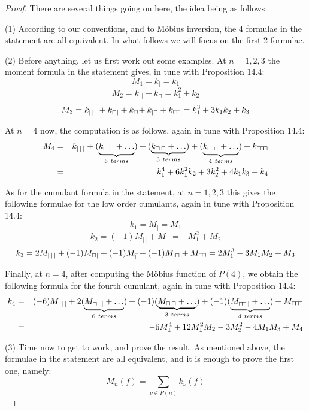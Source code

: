 \documentclass[12pt]{amsbook}
\begin{document}
\begin{proof}
There are several things going on here, the idea being as follows:

\medskip

(1) According to our conventions, and to M\"obius inversion, the 4 formulae in the statement are all equivalent. In what follows we will focus on the first 2 formulae.

\medskip

(2) Before anything, let us first work out some examples. At $n=1,2,3$ the moment formula in the statement gives, in tune with Proposition 14.4:
$$M_1=k_|=k_1$$
$$M_2=k_{|\,|}+k_\sqcap=k_1^2+k_2$$
$$M_3=k_{|\,|\,|}+k_{\sqcap|}+k_{\sqcap\hskip-2.8mm{\ }_|}+k_{|\sqcap}+k_{\sqcap\hskip-0.5mm\sqcap}=k_1^3+3k_1k_2+k_3$$

At $n=4$ now, the computation is as follows, again in tune with Proposition 14.4:
\begin{eqnarray*}
M_4
&=&k_{|\,|\,|}+(\underbrace{k_{\sqcap\,|\,|}+\ldots}_{6\ terms})+(\underbrace{k_{\sqcap\,\sqcap}+\ldots}_{3\ terms})+(\underbrace{k_{\sqcap\hskip-0.5mm\sqcap\,|}+\ldots}_{4\ terms})+k_{\sqcap\hskip-0.5mm\sqcap\hskip-0.5mm\sqcap}\\
&=&k_1^4+6k_1^2k_2+3k_2^2+4k_1k_3+k_4
\end{eqnarray*}

As for the cumulant formula in the statement, at $n=1,2,3$ this gives the following formulae for the low order cumulants, again in tune with Proposition 14.4:
$$k_1=M_|=M_1$$
$$k_2=(-1)M_{|\,|}+M_\sqcap=-M_1^2+M_2$$
$$k_3=2M_{|\,|\,|}+(-1)M_{\sqcap|}+(-1)M_{\sqcap\hskip-2.8mm{\ }_|}+(-1)M_{|\sqcap}+M_{\sqcap\hskip-0.5mm\sqcap}=2M_1^3-3M_1M_2+M_3$$

Finally, at $n=4$, after computing the M\"obius function of $P(4)$, we obtain the following formula for the fourth cumulant, again in tune with Proposition 14.4:
\begin{eqnarray*}
k_4
&=&(-6)M_{|\,|\,|}+2(\underbrace{M_{\sqcap\,|\,|}+\ldots}_{6\ terms})+(-1)(\underbrace{M_{\sqcap\,\sqcap}+\ldots}_{3\ terms})+(-1)(\underbrace{M_{\sqcap\hskip-0.5mm\sqcap\,|}+\ldots}_{4\ terms})+M_{\sqcap\hskip-0.5mm\sqcap\hskip-0.5mm\sqcap}\\
&=&-6M_1^4+12M_1^2M_2-3M_2^2-4M_1M_3+M_4
\end{eqnarray*}

(3) Time now to get to work, and prove the result. As mentioned above, the formulae in the statement are all equivalent, and it is enough to prove the first one, namely:
$$M_n(f)=\sum_{\nu\in P(n)}k_\nu(f)$$


\end{proof}
\end{document}
